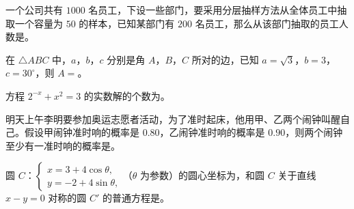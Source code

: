 \begin{question}
一个公司共有 $1000$ 名员工，下设一些部门，要采用分层抽样方法从全体员工中抽取一个容量为 $50$ 的样本，已知某部门有 $200$ 名员工，那么从该部门抽取的员工人数是\gkblank{}。

\end{question}
\begin{question}
在 $\triangle ABC$ 中，$a$，$b$，$c$ 分别是角 $A$，$B$，$C$ 所对的边，已知 $a=\sqrt3$，$b=3$，$c=30^\circ$，则 $A=$\gkblank{}。

\end{question}
\begin{question}
方程 $2^{-x}+x^2=3$ 的实数解的个数为\gkblank{}。

\end{question}
\begin{question}
明天上午李明要参加奥运志愿者活动，为了准时起床，他用甲、乙两个闹钟叫醒自己。假设甲闹钟准时响的概率是 $0.80$，乙闹钟准时响的概率是 $0.90$，则两个闹钟至少有一准时响的概率是\gkblank{}。

\end{question}
\begin{question}
圆 $C$：$\begin{cases}x=3+4\cos\theta,\\ y=-2+4\sin\theta,\end{cases}$（$\theta$ 为参数）的圆心坐标为\gkblank{}，和圆 $C$ 关于直线 $x-y=0$ 对称的圆 $C'$ 的普通方程是\gkblank{}。

\end{question}

